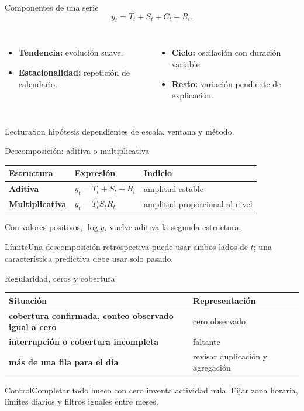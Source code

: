 \documentclass[aspectratio=169,10pt]{beamer}
\newcommand{\concepto}[1]{\textcolor{UAPTeal}{\textbf{#1}}}
\begin{document}
\begin{frame}{Componentes de una serie}\small
\[y_t=T_t+S_t+C_t+R_t.\]
\begin{columns}[T]\begin{itemize}\item \concepto{Tendencia:} evolución suave.\item \concepto{Estacionalidad:} repetición de calendario.\end{itemize}\begin{itemize}\item \concepto{Ciclo:} oscilación con duración variable.\item \concepto{Resto:} variación pendiente de explicación.\end{itemize}\end{columns}
\vspace{.4em}\begin{block}{Lectura}Son hipótesis dependientes de escala, ventana y método.\end{block}
\end{frame}

\begin{frame}{Descomposición: aditiva o multiplicativa}\small
\begin{tabularx}{\textwidth}{>{\bfseries}p{}XX}\toprule Estructura & Expresión & Indicio\\\midrule Aditiva & $y_t=T_t+S_t+R_t$ & amplitud estable\\ Multiplicativa & $y_t=T_tS_tR_t$ & amplitud proporcional al nivel\\\bottomrule\end{tabularx}
Con valores positivos, $\log y_t$ vuelve aditiva la segunda estructura.
\begin{alertblock}{Límite}Una descomposición retrospectiva puede usar ambos lados de $t$; una característica predictiva debe usar solo pasado.\end{alertblock}
\end{frame}

\begin{frame}{Regularidad, ceros y cobertura}\small
\begin{tabularx}{\textwidth}{>{\bfseries}p{}X}\toprule Situación & Representación\\\midrule cobertura confirmada, conteo observado igual a cero & cero observado\\ interrupción o cobertura incompleta & faltante\\ más de una fila para el día & revisar duplicación y agregación\\\bottomrule\end{tabularx}
\begin{alertblock}{Control}Completar todo hueco con cero inventa actividad nula. Fijar zona horaria, límites diarios y filtros iguales entre meses.\end{alertblock}
\end{frame}
\end{document}
